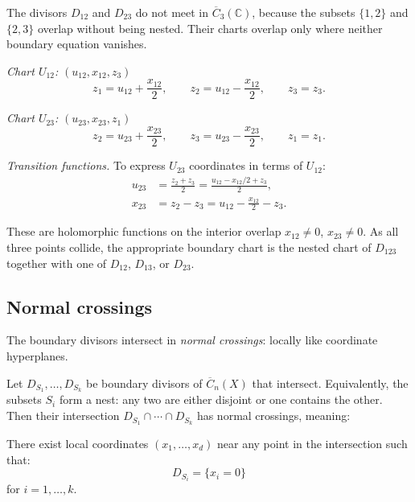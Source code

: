 \begin{example}\label{ex:transition-d12-d23}
The divisors $D_{12}$ and $D_{23}$ do not meet in
$\overline C_3(\mathbb C)$, because the subsets $\{1,2\}$ and
$\{2,3\}$ overlap without being nested. Their charts overlap only where
neither boundary equation vanishes.

\emph{Chart $U_{12}$:} $(u_{12},x_{12},z_3)$
\[
z_1=u_{12}+\frac{x_{12}}2,\qquad
z_2=u_{12}-\frac{x_{12}}2,\qquad z_3=z_3.
\]

\emph{Chart $U_{23}$:} $(u_{23},x_{23},z_1)$
\[
z_2=u_{23}+\frac{x_{23}}2,\qquad
z_3=u_{23}-\frac{x_{23}}2,\qquad z_1=z_1.
\]

\emph{Transition functions.}
To express $U_{23}$ coordinates in terms of $U_{12}$:
\begin{align}
u_{23} &= \frac{z_2+z_3}{2}
=\frac{u_{12}-x_{12}/2+z_3}{2},\\
x_{23} &= z_2-z_3=u_{12}-\frac{x_{12}}2-z_3.
\end{align}

These are holomorphic functions on the interior overlap
$x_{12}\neq0$, $x_{23}\neq0$. As all three points collide, the
appropriate boundary chart is the nested chart of $D_{123}$ together
with one of $D_{12}$, $D_{13}$, or $D_{23}$.
\end{example}

\subsection{Normal crossings}

The boundary divisors intersect in \emph{normal crossings}: locally
like coordinate hyperplanes.

\begin{theorem}\label{thm:normal-crossings-verified}
Let $D_{S_1}, \ldots, D_{S_k}$ be boundary divisors of
$\overline{C}_n(X)$ that intersect. Equivalently, the subsets
$S_i$ form a nest: any two are either disjoint or one contains the
other.
Then their intersection $D_{S_1} \cap \cdots \cap D_{S_k}$ has normal crossings, meaning:

There exist local coordinates $(x_1, \ldots, x_d)$ near any point in the intersection such that:
\[D_{S_i} = \{x_i = 0\}\]
for $i = 1, \ldots, k$.
\end{theorem}

